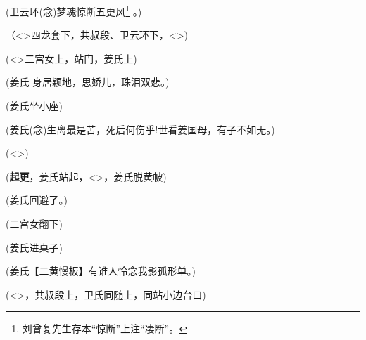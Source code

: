 (卫云环\hspace{15pt}({\akai 念})梦魂惊断五更风\footnote{刘曾复先生存本``惊断''上注``凄断''。}%
。)

（\textless{}\!\textgreater{}{\hwfs 四}龙套{\hwfs 下}，共叔段、卫云环{\hwfs 下}，\textless{}\!\textgreater{})

\vspace{5pt}

(\textless{}\!\textgreater{}{\hwfs 二}宫女{\hwfs 上}，{\hwfs 站门}，姜氏{\hwfs 上})

(姜氏\hspace{25pt}{[}{\akai 引子}{]} 身居颖地，思娇儿，珠泪双悲。)

(姜氏坐{\hwfs 小座})

(姜氏\hspace{25pt}({\akai 念})生离最是苦，死后何伤乎!世看姜国母，有子不如无。)


(\textless{}\!\textgreater{})


({\bfseries\akai 起更}，姜氏{\hwfs 站起}，\textless{}\!\textgreater{}，姜氏{\hwfs 脱黄帔})

(姜氏\hspace{25pt}回避了。)

({\hwfs 二}宫女{\hwfs 翻下})


(姜氏{\hwfs 进桌子})

(姜氏\hspace{25pt}【{\akai 二黄慢板}】有谁人怜念我影孤形单。)

(\textless{}\!\textgreater{}，共叔段{\hwfs 上}，卫氏{\hwfs 同随上}，{\hwfs 同站小边台口})


